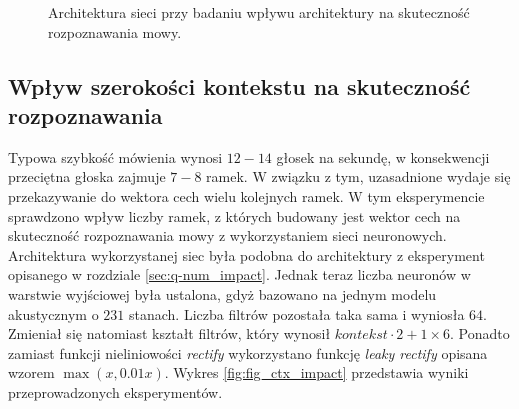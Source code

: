 \documentclass[11pt]{article}
\begin{document}
\begin{figure}[H]
		\label{fig:arch_exp}
		\caption{Architektura sieci przy badaniu wpływu architektury na skuteczność rozpoznawania mowy.}
	\end{figure}
	
	
	\subsection{ Wpływ szerokości kontekstu na skuteczność rozpoznawania }
		Typowa szybkość mówienia wynosi $12-14$ głosek na sekundę, w konsekwencji przeciętna głoska zajmuje $7-8$ ramek. W związku z tym, uzasadnione wydaje się przekazywanie do wektora cech wielu kolejnych ramek. W tym eksperymencie sprawdzono wpływ liczby ramek, z których budowany jest wektor cech na skuteczność rozpoznawania mowy z wykorzystaniem sieci neuronowych. Architektura wykorzystanej siec była podobna do architektury z eksperyment opisanego w rozdziale \ref{sec:q-num_impact}. Jednak teraz liczba neuronów w warstwie wyjściowej była ustalona, gdyż bazowano na jednym modelu akustycznym o $231$ stanach. Liczba filtrów pozostała taka sama i wyniosła $64$. Zmieniał się natomiast kształt filtrów, który wynosił $kontekst \cdot 2 + 1 \times 6$. Ponadto zamiast funkcji nieliniowości \textit{rectify} wykorzystano funkcję \textit{leaky rectify} opisana wzorem $\max(x, 0.01x)$. Wykres \ref{fig:fig_ctx_impact} przedstawia wyniki przeprowadzonych eksperymentów. 
		
\end{document}
